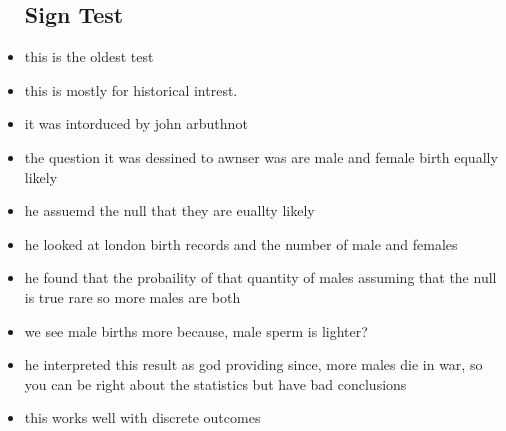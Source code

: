 \documentclass{article}
\begin{document}
\begin{itemize}
\subsection{Sign Test}
\item this is the oldest test 
\item this is mostly for historical intrest. 
\item it was intorduced by john arbuthnot
\item the question it was dessined to awnser was are male and female birth equally likely 
\item he assuemd the null that they are euallty likely
\item he looked at london birth records and the number of male and females 
\item he found that the probaility of that quantity of males assuming that the null is true rare so more males are both 
\item we see male births more because, male sperm is lighter? 
\item he interpreted this result as god providing since, more males die in war, so you can be right about the statistics but have bad conclusions 
\item this works well with discrete outcomes 

\end{itemize}
\end{document}
